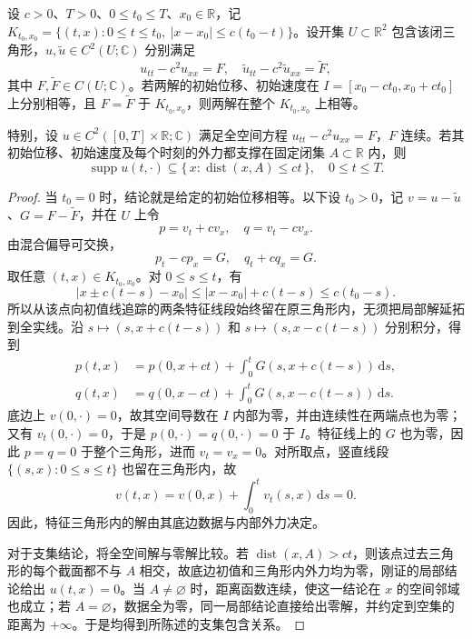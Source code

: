 \begin{proposition}[有限传播速度]\label{b2:prop:09-finite-speed}
设 \(c>0\)、\(T>0\)、\(0\leq t_0\leq T\)、\(x_0\in\mathbb R\)，记 \(K_{t_0,x_0}=\{(t,x):0\leq t\leq t_0,\ |x-x_0|\leq c(t_0-t)\}\)。设开集 \(U\subset\mathbb R^2\) 包含该闭三角形，\(u,\widetilde u\in C^2(U;\mathbb C)\) 分别满足
\[
 u_{tt}-c^2u_{xx}=F,\quad
 \widetilde u_{tt}-c^2\widetilde u_{xx}=\widetilde F,
\]
其中 \(F,\widetilde F\in C(U;\mathbb C)\)。若两解的初始位移、初始速度在 \(I=[x_0-ct_0,x_0+ct_0]\) 上分别相等，且 \(F=\widetilde F\) 于 \(K_{t_0,x_0}\)，则两解在整个 \(K_{t_0,x_0}\) 上相等。

\ProseParagraphBreak

特别，设 \(u\in C^2([0,T]\times\mathbb R;\mathbb C)\) 满足全空间方程 \(u_{tt}-c^2u_{xx}=F\)，\(F\) 连续。若其初始位移、初始速度及每个时刻的外力都支撑在固定闭集 \(A\subset\mathbb R\) 内，则
\[
 \operatorname{supp}u(t,\cdot)\subseteq
 \{\,x:\operatorname{dist}(x,A)\leq ct\,\},\quad 0\leq t\leq T.
\]
\end{proposition}
\begin{proof}
当 \(t_0=0\) 时，结论就是给定的初始位移相等。以下设 \(t_0>0\)，记 \(v=u-\widetilde u\)、\(G=F-\widetilde F\)，并在 \(U\) 上令
\[
 p=v_t+cv_x,\quad q=v_t-cv_x.
\]
由混合偏导可交换，
\[
 p_t-cp_x=G,\quad q_t+cq_x=G.
\]
取任意 \((t,x)\in K_{t_0,x_0}\)。对 \(0\leq s\leq t\)，有
\[
 |x\pm c(t-s)-x_0|
 \leq|x-x_0|+c(t-s)\leq c(t_0-s).
\]
所以从该点向初值线追踪的两条特征线段始终留在原三角形内，无须把局部解延拓到全实线。沿 \(s\mapsto(s,x+c(t-s))\) 和 \(s\mapsto(s,x-c(t-s))\) 分别积分，得到
\[
 \begin{aligned}
 p(t,x)&=p(0,x+ct)+\int_0^tG(s,x+c(t-s))\,\mathrm{d}s,\\
 q(t,x)&=q(0,x-ct)+\int_0^tG(s,x-c(t-s))\,\mathrm{d}s.
 \end{aligned}
\]
底边上 \(v(0,\cdot)=0\)，故其空间导数在 \(I\) 内部为零，并由连续性在两端点也为零；又有 \(v_t(0,\cdot)=0\)，于是 \(p(0,\cdot)=q(0,\cdot)=0\) 于 \(I\)。特征线上的 \(G\) 也为零，因此 \(p=q=0\) 于整个三角形，进而 \(v_t=v_x=0\)。对所取点，竖直线段 \(\{(s,x):0\leq s\leq t\}\) 也留在三角形内，故
\[
 v(t,x)=v(0,x)+\int_0^tv_t(s,x)\,\mathrm{d}s=0.
\]
因此，特征三角形内的解由其底边数据与内部外力决定。

对于支集结论，将全空间解与零解比较。若 \(\operatorname{dist}(x,A)>ct\)，则该点过去三角形的每个截面都不与 \(A\) 相交，故底边初值和三角形内外力均为零，刚证的局部结论给出 \(u(t,x)=0\)。当 \(A\ne\varnothing\) 时，距离函数连续，使这一结论在 \(x\) 的空间邻域也成立；若 \(A=\varnothing\)，数据全为零，同一局部结论直接给出零解，并约定到空集的距离为 \(+\infty\)。于是均得到所陈述的支集包含关系。
\end{proof}

